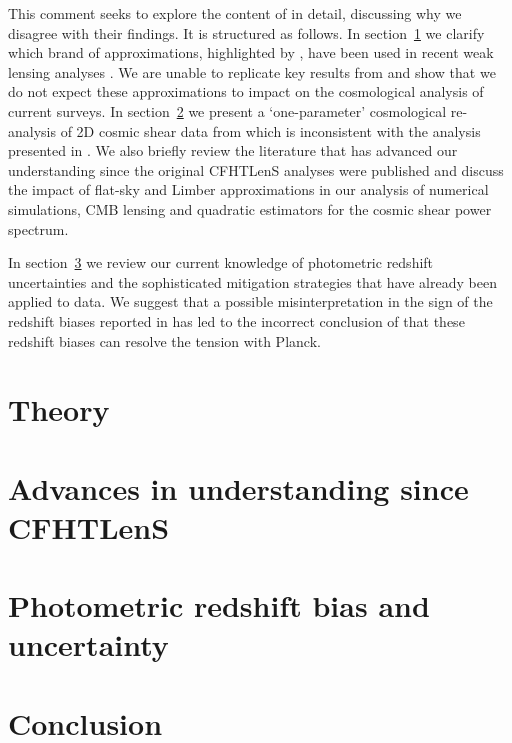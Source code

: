 \documentclass[fleqn, usenatbib]{mnras}
\begin{document}
This comment seeks to explore the content of \citet{kitching/etal:2016} in detail, discussing why we disagree with their findings.  It is structured as follows.  In section~\ref{sec:theory} we clarify which brand of approximations, highlighted by \citet{kitching/etal:2016}, have been used in recent weak lensing analyses \citep{joudaki/etal:2016, hildebrandt/etal:2016, joudaki/etal:2017}.  We are unable to replicate key results from \citet{kitching/etal:2016} and show that we do not expect these approximations to impact on the cosmological analysis of current surveys.  In section~\ref{sec:cfhtlens} we present a `one-parameter' cosmological re-analysis of 2D cosmic shear data from \citet{kilbinger/etal:2013} which is inconsistent with the analysis presented in \citet{kitching/etal:2016}.  We also briefly review the literature that has advanced our understanding since the original CFHTLenS analyses were published and discuss the impact of flat-sky and Limber approximations in our analysis of numerical simulations, CMB lensing and quadratic estimators for the cosmic shear power spectrum.

In section~\ref{sec:photoz} we review our current knowledge of photometric redshift uncertainties and the sophisticated mitigation strategies that have already been applied to data.  We suggest that a possible misinterpretation in the sign of the redshift biases reported in \citet{choi/etal:2016} has led to the incorrect conclusion of \citet{kitching/etal:2016} that these redshift biases can resolve the tension with Planck.  

\section{Theory}
\label{sec:theory}


\section{Advances in understanding since CFHTLenS}
\label{sec:cfhtlens}


\section{Photometric redshift bias and uncertainty}
\label{sec:photoz}


\section{Conclusion}
\label{sec:conclusion}




\end{document}
